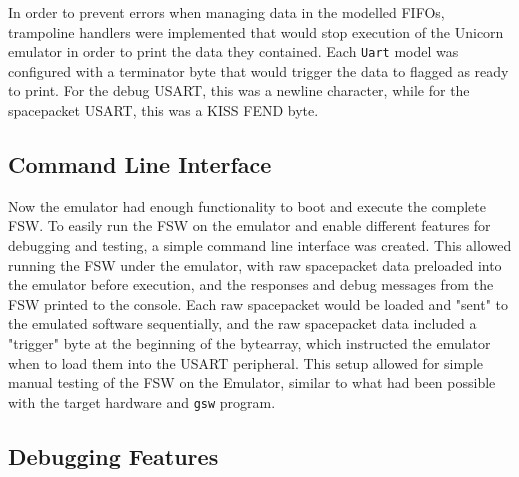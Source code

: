 \documentclass[../report.tex]{subfiles}
\begin{document}
In order to prevent errors when managing data in the modelled FIFOs, trampoline
handlers were implemented that would stop execution of the Unicorn emulator in
order to print the data they contained. Each \lstinline|Uart| model was
configured with a terminator byte that would trigger the data to flagged as
ready to print. For the debug USART, this was a newline character, while for
the spacepacket USART, this was a KISS FEND byte.

\subsection{Command Line Interface}

Now the emulator had enough functionality to boot and execute the complete FSW.
To easily run the FSW on the emulator and enable different features for
debugging and testing, a simple command line interface was created. This allowed
running the FSW under the emulator, with raw spacepacket data preloaded into
the emulator before execution, and the responses and debug messages from the
FSW printed to the console. Each raw spacepacket would be loaded and "sent" to
the emulated software sequentially, and the raw spacepacket data included a
"trigger" byte at the beginning of the bytearray, which instructed the emulator
when to load them into the USART peripheral. This setup allowed for simple
manual testing of the FSW on the Emulator, similar to what had been possible
with the target hardware and \lstinline|gsw| program.

\subsection{Debugging Features}
\end{document}
